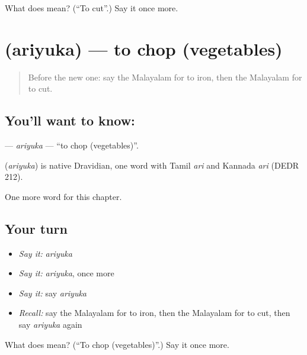 \begin{tcolorbox}[breakable,colback=teal!4,colframe=teal!35!black,title={Before you move on}]
What does  mean? (\textquotedblleft{}To cut\textquotedblright{}.) Say it once more.
\end{tcolorbox}
\section[\texorpdfstring{\ml{അരിയുക} (ariyuka)}{അരിയുക (ariyuka)}]{ (ariyuka) — to chop (vegetables)}

\label{lesson:ML-C302-ariyuka}



\begin{quote}
Before the new one: say the Malayalam for to iron, then the Malayalam for to cut.
\end{quote}

\subsection*{You'll want to know: }
\textbf{} — \emph{ariyuka} — \textquotedblleft{}to chop (vegetables)\textquotedblright{}.

\begin{cousinweb}
\textbf{} (\emph{ariyuka}) is native Dravidian, one word with Tamil \emph{ari} and Kannada \emph{ari} (DEDR 212).
\end{cousinweb}

\begin{grammarlens}[title={What you've built}]
One more word for this chapter.
\end{grammarlens}

\subsection*{Your turn}
\begin{itemize}
\raggedright
  \item \emph{Say it:} \emph{ariyuka}
  \item \emph{Say it:} \emph{ariyuka}, once more
  \item \emph{Say it:} say \emph{ariyuka}
  \item \emph{Recall:} say the Malayalam for to iron, then the Malayalam for to cut, then say \emph{ariyuka} again
\end{itemize}

\begin{tcolorbox}[breakable,colback=teal!4,colframe=teal!35!black,title={Before you move on}]
What does  mean? (\textquotedblleft{}To chop (vegetables)\textquotedblright{}.) Say it once more.
\end{tcolorbox}
